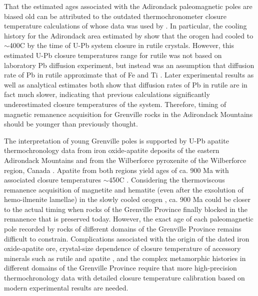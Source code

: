 \documentclass[draft]{agujournal2019}
\begin{document}
That the estimated ages associated with the Adirondack paleomagnetic poles are biased old can be attributed to the outdated thermochronometer closure temperature calculations of  whose data was used by . In particular, the cooling history for the Adirondack area estimated by  show that the orogen had cooled to $\sim$400\textdegree C by the time of U-Pb system closure in rutile crystals. However, this estimated U-Pb closure temperatures range for rutile was not based on laboratory Pb diffusion experiment, but instead was an assumption that diffusion rate of Pb in rutile approximate that of Fe and Ti \cite{Mezger1989a}. Later experimental results \cite{Cherniak2000a} as well as analytical estimates \cite{Vry2006a, Kooijman2010a} both show that diffusion rates of Pb in rutile are in fact much slower, indicating that previous calculations significantly underestimated closure temperatures of the system. Therefore, timing of magnetic remanence acquisition for Grenville rocks in the Adirondack Mountains should be younger than previously thought. 

The interpretation of young Grenville poles is supported by U-Pb apatite thermochronology data from iron oxide-apatite deposits of the eastern Adirondack Mountains \cite{Krestianinov2021a} and from the Wilberforce pyroxenite of the Wilberforce region, Canada \cite{Paul2021a}. Apatite from both regions yield ages of ca. 900 Ma with associated closure temperatures $\sim$450\textdegree C \cite{Cherniak1991a, Chamberlain2001a}. Considering the thermoviscous remanence acquisition of magnetite and hematite (even after the exsolution of hemo-ilmenite lamellae) in the slowly cooled orogen \cite{Pullaiah1975a, Dodson1980a}, ca. 900 Ma could be closer to the actual timing when rocks of the Grenville Province finally blocked in the remanence that is preserved today. However, the exact age of each paleomagnetic pole recorded by rocks of different domains of the Grenville Province remains difficult to constrain. Complications associated with the origin of the dated iron oxide-apatite ore, crystal-size dependence of closure temperature of accessory minerals such as rutile and apatite \cite{Smye2018a, Chamberlain2001a}, and the complex metamorphic histories in different domains of the Grenville Province require that more high-precision thermochronology data with detailed closure temperature calibration based on modern experimental results are needed. 
\end{document}
